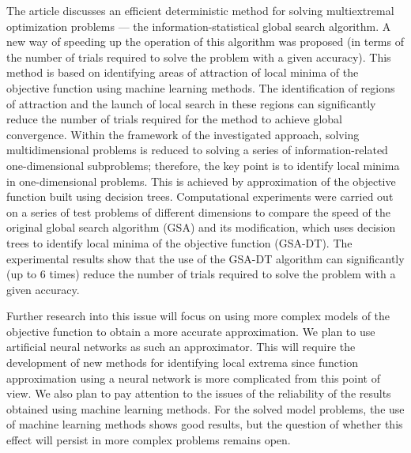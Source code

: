 \documentclass[entropy,article,submit,moreauthors,pdftex]{Definitions/mdpi}
\begin{document}
The article discusses an efficient deterministic method for solving multiextremal optimization problems --- the information-statistical global search algorithm.
A new way of speeding up the operation of this algorithm was proposed (in terms of the number of trials required to solve the problem with a given accuracy). This method is based on identifying areas of attraction of local minima of the objective function using machine learning methods. The identification of regions of attraction and the launch of local search in these regions can significantly reduce the number of trials required for the method to achieve global convergence. 
Within the framework of the investigated approach, solving multidimensional problems is reduced to solving a series of information-related one-dimensional subproblems; therefore, the key point is to identify local minima in one-dimensional problems. This is achieved by approximation of the objective function built using decision trees. 
Computational experiments were carried out on a series of test problems of different dimensions to compare the speed of the original global search algorithm (GSA) and its modification, which uses decision trees to identify local minima of the objective function (GSA-DT). 
The experimental results show that the use of the GSA-DT algorithm can significantly (up to 6 times) reduce the number of trials required to solve the problem with a given accuracy.

Further research into this issue will focus on using more complex models of the objective function to obtain a more accurate approximation. We plan to use artificial neural networks as such an approximator. This will require the development of new methods for identifying local extrema since function approximation using a neural network is more complicated from this point of view. We also plan to pay attention to the issues of the reliability of the results obtained using machine learning methods. For the solved model problems, the use of machine learning methods shows good results, but the question of whether this effect will persist in more complex problems remains open.




\end{document}
